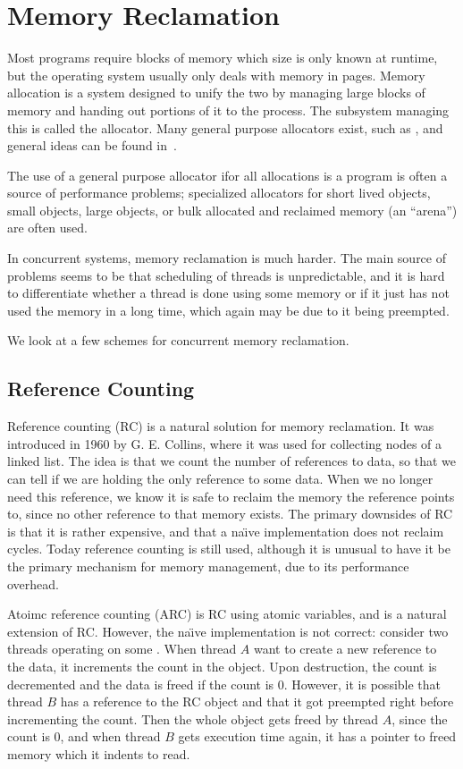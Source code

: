\section{Memory Reclamation}

Most programs require blocks of memory which size is only known at runtime, but the operating
system usually only deals with memory in pages. Memory allocation is a system designed to unify the
two by managing large blocks of memory and handing out portions of it to the process. The subsystem
managing this is called the allocator. Many general purpose allocators exist, such as
\cite{glibc-malloc,jemalloc,tcmalloc}, and general ideas can be found in~\cite{knuth1997vol1}.

The use of a general purpose allocator ifor all allocations is a program is often a source of
performance problems; specialized allocators for short lived objects, small objects, large objects,
or bulk allocated and reclaimed memory (an ``arena'') are often used.

In concurrent systems, memory reclamation is much harder. The main source of problems seems to be
that scheduling of threads is unpredictable, and it is hard to differentiate whether a thread is
done using some memory or if it just has not used the memory in a long time, which again may be due
to it being preempted.

We look at a few schemes for concurrent memory reclamation.


\subsection{Reference Counting\label{sec:background-rc}}

Reference counting (RC) is a natural solution for memory reclamation. It was introduced in 1960 by
G. E.  Collins\cite{collins1960method}, where it was used for collecting nodes of a linked list.
The idea is that we count the number of references to data, so that we can tell if we are holding
the only reference to some data. When we no longer need this reference, we know it is safe to
reclaim the memory the reference points to, since no other reference to that memory exists. The
primary downsides of RC is that it is rather expensive, and that a na\"\i{}ve implementation does
not reclaim cycles. Today reference counting is still used, although it is unusual to have it be
the primary mechanism for memory management, due to its performance overhead.

Atoimc reference counting (ARC) is RC using atomic variables, and is a natural extension of RC\@.
However, the na\"\i{}ve implementation is not correct: consider two threads operating on some
. When thread $A$ want to create a new reference to the data, it increments the count
in the  object. Upon destruction, the count is decremented and the data is freed if the
count is 0. However, it is possible that thread $B$ has a reference to the RC object and that it
got preempted right before incrementing the count. Then the whole object gets freed by thread $A$,
since the count is 0, and when thread $B$ gets execution time again, it has a pointer to freed
memory which it indents to read.

